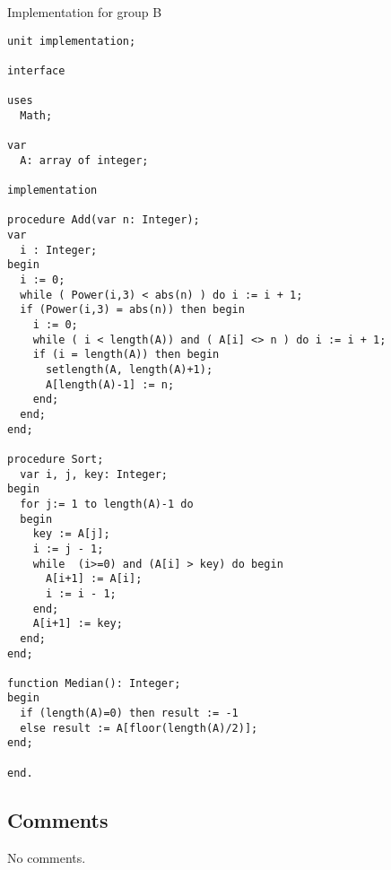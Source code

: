 \documentclass[a4paper,twoside,11pt]{article}
\begin{document}
\begin{algorithm}
\caption{Implementation for group B}
\label{imp:grB}
\begin{lstlisting}
unit implementation;

interface

uses
  Math;

var
  A: array of integer;

implementation

procedure Add(var n: Integer);
var
  i : Integer;
begin
  i := 0;
  while ( Power(i,3) < abs(n) ) do i := i + 1;
  if (Power(i,3) = abs(n)) then begin
    i := 0;
    while ( i < length(A)) and ( A[i] <> n ) do i := i + 1;
    if (i = length(A)) then begin
      setlength(A, length(A)+1);
      A[length(A)-1] := n;
    end;
  end;
end;

procedure Sort;
  var i, j, key: Integer;
begin
  for j:= 1 to length(A)-1 do
  begin
    key := A[j];
    i := j - 1;
    while  (i>=0) and (A[i] > key) do begin
      A[i+1] := A[i];
      i := i - 1;
    end;
    A[i+1] := key;
  end;
end;

function Median(): Integer;
begin
  if (length(A)=0) then result := -1
  else result := A[floor(length(A)/2)];
end;

end.
\end{lstlisting}
\end{algorithm}

\subsection{Comments}
No comments.
\end{document}
